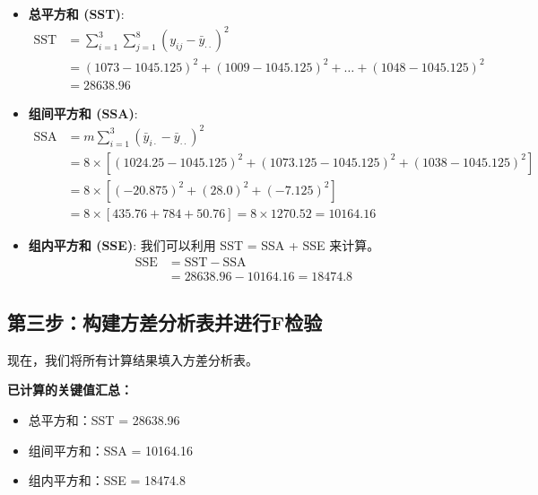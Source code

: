 \documentclass[12pt, a4paper]{amsart}
\begin{document}
\begin{itemize}
    \item \textbf{总平方和 (SST)}:
    \begin{align*}
    \text{SST} &= \sum_{i=1}^{3} \sum_{j=1}^{8} (y_{ij} - \bar{y}_{\cdot\cdot})^2 \\
               &= (1073 - 1045.125)^2 + (1009 - 1045.125)^2 + \ldots + (1048 - 1045.125)^2 \\
               &= 28638.96
    \end{align*}
    \item \textbf{组间平方和 (SSA)}:
    \begin{align*}
    \text{SSA} &= m \sum_{i=1}^{3} (\bar{y}_{i\cdot} - \bar{y}_{\cdot\cdot})^2 \\
               &= 8 \times [ (1024.25 - 1045.125)^2 + (1073.125 - 1045.125)^2 + (1038 - 1045.125)^2 ] \\
               &= 8 \times [ (-20.875)^2 + (28.0)^2 + (-7.125)^2 ] \\
               &= 8 \times [ 435.76 + 784 + 50.76 ] = 8 \times 1270.52 = 10164.16
    \end{align*}
    \item \textbf{组内平方和 (SSE)}: 我们可以利用 SST = SSA + SSE 来计算。
    \begin{align*}
    \text{SSE} &= \text{SST} - \text{SSA} \\
               &= 28638.96 - 10164.16 = 18474.8
    \end{align*}
\end{itemize}

\subsection{第三步：构建方差分析表并进行F检验}
现在，我们将所有计算结果填入方差分析表。

\textbf{已计算的关键值汇总：}
\begin{itemize}
    \item 总平方和：SST = 28638.96
    \item 组间平方和：SSA = 10164.16
    \item 组内平方和：SSE = 18474.8
\end{itemize}
\end{document}
